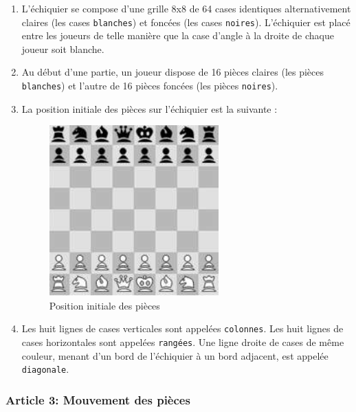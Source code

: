 \begin{enumerate}

\item L’échiquier se compose d’une grille 8x8 de 64 cases identiques alternativement claires (les cases \texttt{blanches}) et foncées (les cases \texttt{noires}).
L’échiquier est placé entre les joueurs de telle manière que la case d’angle à la droite de chaque joueur
soit blanche.

\item Au début d’une partie, un joueur dispose de 16 pièces claires (les pièces \texttt{blanches}) et l’autre de 16 pièces foncées (les pièces \texttt{noires}).

\item La position initiale des pièces sur l'échiquier est la suivante :

\begin{figure}[H]
  \centering
  \includegraphics[scale=0.5]{init_pos.png}
  \caption{Position initiale des pièces}
\end{figure}

\item Les  huit  lignes  de  cases  verticales  sont  appelées \texttt{colonnes}.  Les  huit  lignes  de  cases  horizontales  sont appelées \texttt{rangées}. Une ligne droite de cases de même couleur, menant d’un bord de l’échiquier à un bord adjacent, est appelée \texttt{diagonale}.

\end{enumerate}

\subsubsection{Article 3: Mouvement des pièces}

